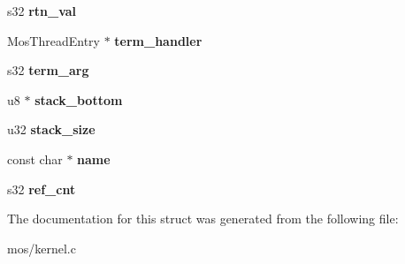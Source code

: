 \begin{DoxyCompactItemize}
\mbox{\label{structThread_a87c95f46840af831c15a8d3ce4bf07f4}} 
s32 {\bfseries rtn\+\_\+val}
\item 
\mbox{\label{structThread_a3d0af2b2fdad8db046c10e424dec1f5e}} 
Mos\+Thread\+Entry $\ast$ {\bfseries term\+\_\+handler}
\item 
\mbox{\label{structThread_ab22cfb674ca05936706e250adf61d9d9}} 
s32 {\bfseries term\+\_\+arg}
\item 
\mbox{\label{structThread_ad4063736b201d8cf7a550404cc215bb1}} 
u8 $\ast$ {\bfseries stack\+\_\+bottom}
\item 
\mbox{\label{structThread_afeaf0a58480ba57c3d63b9d50bb55141}} 
u32 {\bfseries stack\+\_\+size}
\item 
\mbox{\label{structThread_adf8367c62ce6a746d82304600cbd2f9c}} 
const char $\ast$ {\bfseries name}
\item 
\mbox{\label{structThread_ae44b9fe64e38313776b5feef642a9356}} 
s32 {\bfseries ref\+\_\+cnt}
\end{DoxyCompactItemize}


The documentation for this struct was generated from the following file\+:\begin{DoxyCompactItemize}
\item 
mos/kernel.\+c\end{DoxyCompactItemize}
